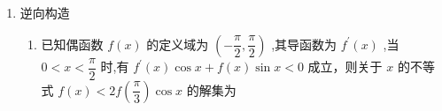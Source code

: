 \begin{enumerate}
\begin{enumerate}
\begin{jieda}
            构造函数 $f\left( x\right)  = {{e}}^{x} + x$ ,则 $f\left( x\right)$ 是 $\mathbf{R}$ 上的增函数,则由 $f\left( x\right)  \geq  f\left( {\ln \left( {mx}\right) }\right)$ 得: $x \geq  \ln \left( {mx}\right)$，即 $m \leq  \dfrac{{{e}}^{x}}{x}$
            
            令 $g\left( x\right)  = \dfrac{{{e}}^{x}}{x},x \in  \left( {0, + \infty }\right) ,{g}^{\prime }\left( x\right)  = \dfrac{\left( {x - 1}\right) {{e}}^{x}}{{x}^{2}}$，当 $x \in  \left( {0,1}\right)$ , ${g}^{\prime }\left( x\right)  < 0$ ,则 $g\left( x\right)$ 单调递减，当 $x \in  \left( {1, + \infty }\right)$ , ${g}^{\prime }\left( x\right)  > 0$ ,则 $g\left( x\right)$ 单调递增
            
            故$g{\left( x\right) }_{\min } = g\left( 1\right)  = {e}$ ,则 $m \leq  {e}$ ,又 $m > 0$ ,则 $0 < m \leq  {e}$ .
        \end{jieda}
        \item 已知函数 $f\left( x\right)  = \dfrac{\ln x}{x} - x + 1$ .若对于任意的 $\left( {0, + \infty }\right) ,f\left( x\right)  +x+ \dfrac{1}{x} \leq  a{e}^{x}$ 恒成立,求实数 $a$ 的最小值.
        \begin{jieda}
            $\dfrac{\ln x}{x} - x + x + 1 + \dfrac{1}{x} \leq ae^x$在$\left( {0, + \infty }\right)$ 恒成立

            即$a \geq \dfrac{lnx+x+1}{xe^x}$， 令$t = xe^x$，则$lnt = x + lnx$，故有$a \geq \dfrac{lnt+1}{t}$在$t \in (0, +\infty)$恒成立.

            \ps 若为填空题，此时直曲分离，数形结合可出答案

            设$g(t) = \dfrac{lnt+1}{t}$，$g'(t) = \dfrac{-lnt}{t^2}$，故$t \in (0, 1)$时$g'(t) > 0$，$g(t)$严增，$t \in (1, +\infty)$时$g'(t) < 0$，$g(t)$严减，因此$a \geq g(1) = 1$，所以$a$ 的最小值为$1$
        \end{jieda}
    \end{enumerate}

    
    \item 逆向构造
    \begin{enumerate}
        \item 已知偶函数 $f\left( x\right)$ 的定义域为 $\left( {-\dfrac{\pi }{2},\dfrac{\pi }{2}}\right)$ ,其导函数为 ${f}^{\prime }\left( x\right)$ ,当 $0 < x < \dfrac{\pi }{2}$ 时,有 ${f}^{\prime }\left( x\right) \cos x + f\left( x\right) \sin x < 0$ 成立，则关于 $x$ 的不等式 $f\left( x\right)  < {2f}\left( \dfrac{\pi }{3}\right) \cos x$ 的解集为


\end{enumerate}
\end{enumerate}
